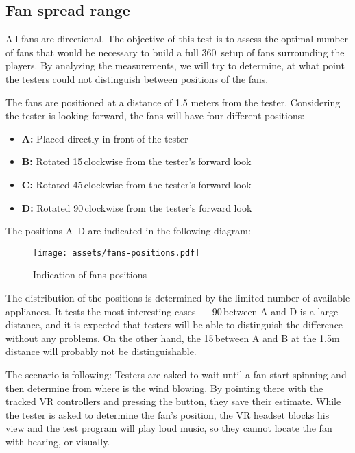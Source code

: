 \hypertarget{x-fan-spread-range}{\subsection{Fan spread range}}
All fans are directional. The objective of this test is to assess
the optimal number of fans that would be necessary to build a full 360\degree\,
setup of fans surrounding the players. By analyzing the measurements,
we will try to determine, at what point the testers could not distinguish
between positions of the fans.


The fans are positioned at a distance of 1.5 meters from the tester.
Considering the tester is looking forward, the fans will
have four different positions:


\begin{itemize}
    \itemsep0em

\item \textbf{A:} Placed directly in front of the tester

\item \textbf{B:} Rotated 15\degree\,clockwise from the tester’s forward look

\item \textbf{C:} Rotated 45\degree\,clockwise from the tester’s forward look

\item \textbf{D:} Rotated 90\degree\,clockwise from the tester’s forward look

\end{itemize}

\pagebreak

The positions A--D are indicated in the following diagram:

\begin{figure}[H]{}
\centering\texttt{[image: assets/fans-positions.pdf]}
\caption{Indication of fans positions}
\label{fanpos}
\end{figure}

The distribution of the positions is determined by the limited number of
available appliances. It tests the most interesting cases — 
90\degree\,between A and D is a large distance, and it is expected that testers
will be able to distinguish the difference without any problems.
On the other hand, the 15\degree\,between
A and B at the 1.5m distance will probably not be distinguishable.



The scenario is following: Testers are asked to wait until a fan start spinning
and then determine from where is the wind blowing. By pointing there with the
tracked VR controllers and pressing the button, they save their estimate.
While the tester is asked to determine the fan’s position, the VR headset
blocks his view and the test program will play loud music, so they
cannot locate the fan with hearing, or visually.

